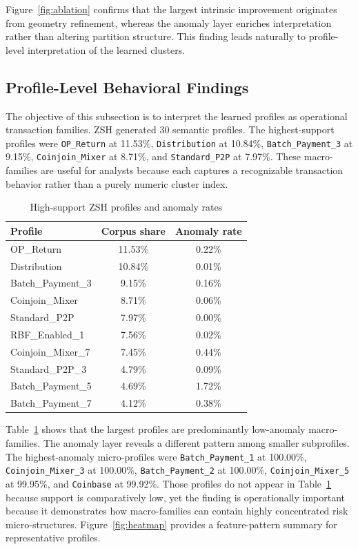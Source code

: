 \documentclass{ieeeaccess}
\begin{document}
Figure~\ref{fig:ablation} confirms that the largest intrinsic improvement originates from geometry refinement, whereas the anomaly layer enriches interpretation rather than altering partition structure. This finding leads naturally to profile-level interpretation of the learned clusters.

\FloatBarrier

\subsection{Profile-Level Behavioral Findings}

The objective of this subsection is to interpret the learned profiles as operational transaction families. ZSH generated 30 semantic profiles. The highest-support profiles were \texttt{OP\_Return} at 11.53\%, \texttt{Distribution} at 10.84\%, \texttt{Batch\_Payment\_3} at 9.15\%, \texttt{Coinjoin\_Mixer} at 8.71\%, and \texttt{Standard\_P2P} at 7.97\%. These macro-families are useful for analysts because each captures a recognizable transaction behavior rather than a purely numeric cluster index.

\begin{table}[!t]
\caption{High-support ZSH profiles and anomaly rates}
\label{tab:profiles}
\centering
\begin{tabular}{lcc}
\toprule
Profile & Corpus share & Anomaly rate \\
\midrule
OP\_Return & 11.53\% & 0.22\% \\
Distribution & 10.84\% & 0.01\% \\
Batch\_Payment\_3 & 9.15\% & 0.16\% \\
Coinjoin\_Mixer & 8.71\% & 0.06\% \\
Standard\_P2P & 7.97\% & 0.00\% \\
RBF\_Enabled\_1 & 7.56\% & 0.02\% \\
Coinjoin\_Mixer\_7 & 7.45\% & 0.44\% \\
Standard\_P2P\_3 & 4.79\% & 0.09\% \\
Batch\_Payment\_5 & 4.69\% & 1.72\% \\
Batch\_Payment\_7 & 4.12\% & 0.38\% \\
\bottomrule
\end{tabular}
\end{table}

Table~\ref{tab:profiles} shows that the largest profiles are predominantly low-anomaly macro-families. The anomaly layer reveals a different pattern among smaller subprofiles. The highest-anomaly micro-profiles were \texttt{Batch\_Payment\_1} at 100.00\%, \texttt{Coinjoin\_Mixer\_3} at 100.00\%, \texttt{Batch\_Payment\_2} at 100.00\%, \texttt{Coinjoin\_Mixer\_5} at 99.95\%, and \texttt{Coinbase} at 99.92\%. Those profiles do not appear in Table~\ref{tab:profiles} because support is comparatively low, yet the finding is operationally important because it demonstrates how macro-families can contain highly concentrated risk micro-structures.
Figure~\ref{fig:heatmap} provides a feature-pattern summary for representative profiles.
\end{document}

